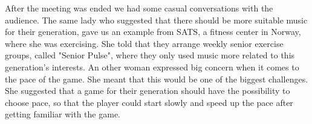 After the meeting was ended we had some casual conversations with the audience. The same lady who suggested that there should be more suitable music for their generation, gave us an example from SATS, a fitness center in Norway, where she was exercising. She told that they arrange weekly senior exercise groups, called "Senior Pulse", where they only used music more related to this generation's interests. An other woman expressed big concern when it comes to the pace of the game. She meant that this would be one of the biggest challenges. She suggested that a game for their generation should have the possibility to choose pace, so that the player could start slowly and speed up the pace after getting familiar with the game.  

